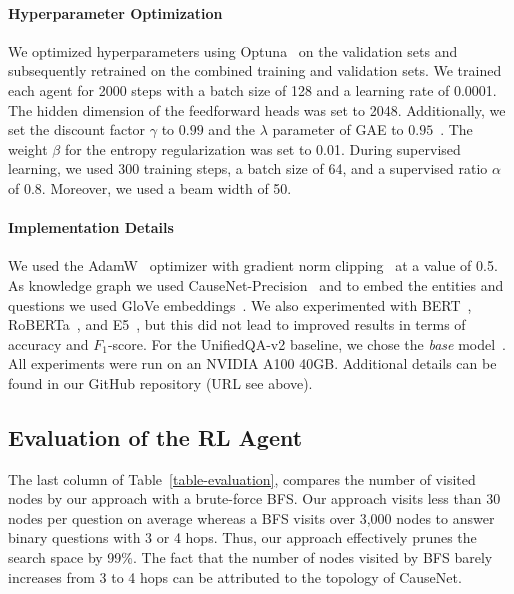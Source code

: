 \paragraph{Hyperparameter Optimization}
We optimized hyperparameters using Optuna~\cite{Akiba2019Optuna} on the validation sets and subsequently retrained on the combined training and validation sets. We trained each agent for 2000 steps with a batch size of 128 and a learning rate of 0.0001. The hidden dimension of the feedforward heads was set to 2048. Additionally, we set the discount factor $\gamma$ to $0.99$ and the $\lambda$ parameter of GAE to $0.95$~\cite{Schulman2016GAE}. The weight $\beta$ for the entropy regularization was set to 0.01. During supervised learning, we used 300 training steps, a batch size of 64, and a supervised ratio $\alpha$ of 0.8. Moreover, we used a beam width of 50.

\paragraph{Implementation Details}
We used the AdamW~\cite{Loshchilov2019AdamW} optimizer with gradient norm clipping~\cite{Pascanu2013Clip} at a value of 0.5. As knowledge graph we used CauseNet-Precision~\cite{Heindorf2020Causenet} and to embed the entities and questions we used GloVe embeddings~\cite{Pennington2014Glove}.
We also experimented with BERT~\cite{Devlin2018BERT}, RoBERTa~\cite{Liu2019Roberta}, and E5~\cite{Wang2022E5}, but this did not lead to improved results in terms of accuracy and $F_1$-score.
For the UnifiedQA-v2 baseline, we chose the \textit{base} model~\cite{Khashabi2020UnifiedQA, Khashabi2022UnifiedQA2}. All experiments were run on an NVIDIA A100 40GB. Additional details can be found in our GitHub repository (URL see above).

\subsection{Evaluation of the RL Agent}
\label{subsec:evaluation-approach}



The last column of Table~\ref{table-evaluation}, compares the number of visited nodes by our approach with a brute-force BFS. Our approach visits less than 30 nodes per question on average whereas a BFS visits over 3,000 nodes to answer binary questions with 3 or 4 hops. Thus, our approach effectively prunes the search space by 99\%. The fact that the number of nodes visited by BFS barely increases from 3 to 4 hops can be attributed to the topology of CauseNet.

